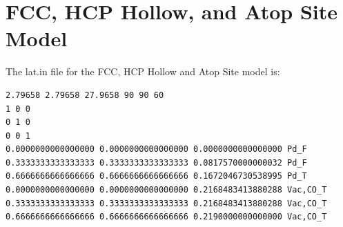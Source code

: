 \documentclass[11pt]{article}
\begin{document}
\clearpage
\section{FCC, HCP Hollow, and Atop Site Model} \label{FCCHCPAtopSiteCE}

The lat.in file for the FCC, HCP Hollow and Atop Site model is:
\begin{verbatim}
2.79658 2.79658 27.9658 90 90 60
1 0 0
0 1 0
0 0 1
0.0000000000000000 0.0000000000000000 0.0000000000000000 Pd_F
0.3333333333333333 0.3333333333333333 0.0817570000000032 Pd_F
0.6666666666666666 0.6666666666666666 0.1672046730538995 Pd_T
0.0000000000000000 0.0000000000000000 0.2168483413880288 Vac,CO_T
0.3333333333333333 0.3333333333333333 0.2168483413880288 Vac,CO_T
0.6666666666666666 0.6666666666666666 0.2190000000000000 Vac,CO_T
\end{verbatim}
\end{document}
